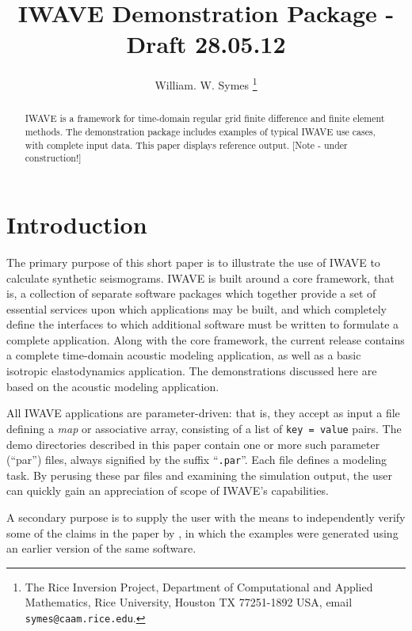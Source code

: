 \documentclass [12pt]{georeport}
\begin{document}
\title{IWAVE Demonstration Package - Draft 28.05.12}
\author{William. W. Symes \thanks{The Rice Inversion Project,
Department of Computational and Applied Mathematics, Rice University,
Houston TX 77251-1892 USA, email {\tt symes@caam.rice.edu}.}}

\maketitle
\parskip 12pt
\begin{abstract}
IWAVE is a framework for time-domain regular grid finite difference and finite element methods. The demonstration package includes examples of typical IWAVE use cases, with complete input data. This paper displays reference output. [Note - under construction!]
\end{abstract}

\section{Introduction}
The primary purpose of this short paper is to illustrate the use of IWAVE to calculate synthetic seismograms. IWAVE is built around a core framework, that is, a collection of separate software packages which together provide a set of essential services upon which applications may be built, and which completely define the interfaces to which additional software must be written to formulate a complete application. Along with the core framework, the current release contains a complete time-domain acoustic modeling application, as well as a basic isotropic elastodynamics application.
The demonstrations discussed here are based on the acoustic modeling application.

All IWAVE applications are parameter-driven: that is, they accept as input a file defining a {\em map} or associative array, consisting of a list of {\tt key = value} pairs. The demo directories described in this paper contain one or more such parameter (``par'') files, always signified by the suffix ``{\tt .par}''. Each file defines a modeling task. By perusing these par files and examining the simulation output, the user can quickly gain an appreciation of scope of IWAVE's capabilities. 

A secondary purpose is to supply the user with the means to independently verify some of the claims in the paper by \cite{SymesVdovina:09}, in which the examples were generated using an earlier version of the same software.
\end{document}
